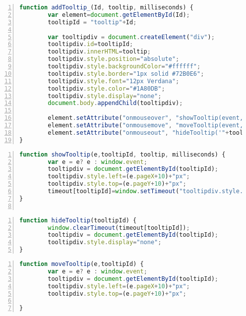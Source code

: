 \begin{frame}[fragile]
\tiny{\begin{lstlisting}[language=JavaScript, 
		   numbers=left,
		   numbersep=3pt,
		   breaklines=true
		   firstnumber=last]
function addTooltip_(Id, tooltip, milliseconds) {
        var element=document.getElementById(Id);
        tooltipId = "tooltip"+Id;

        var tooltipdiv = document.createElement("div");
        tooltipdiv.id=tooltipId;
        tooltipdiv.innerHTML=tooltip;
        tooltipdiv.style.position="absolute";
        tooltipdiv.style.backgroundColor="#ffffff";
        tooltipdiv.style.border="1px solid #72B0E6";
        tooltipdiv.style.font="12px Verdana";
        tooltipdiv.style.color="#1A80DB";
        tooltipdiv.style.display="none";
        document.body.appendChild(tooltipdiv);

        element.setAttribute("onmouseover", "showTooltip(event,'"+tooltipId+"', '"+tooltip+"',"+milliseconds+");");
        element.setAttribute("onmousemove", "moveTooltip(event,'"+tooltipId+"');");
        element.setAttribute("onmouseout", "hideTooltip('"+tooltipId+"');");
}

\end{lstlisting}}
\end{frame}
\begin{frame}[fragile]
\tiny{\begin{lstlisting}[language=JavaScript, 
		   numbers=left,
		   numbersep=3pt,
		   breaklines=true]		 
function showTooltip(e,tooltipId, tooltip, milliseconds) {
        var e = e? e : window.event;
        tooltipdiv = document.getElementById(tooltipId);
        tooltipdiv.style.left=(e.pageX+10)+"px";
        tooltipdiv.style.top=(e.pageY+10)+"px";
        timeout[tooltipId]=window.setTimeout("tooltipdiv.style.display=\"block\"", milliseconds);
}
		   
\end{lstlisting}}
\end{frame}
\begin{frame}[fragile]
\tiny{\begin{lstlisting}[language=JavaScript, 
		   numbers=left,
		   numbersep=3pt,
		   breaklines=true]		 
function hideTooltip(tooltipId) {
        window.clearTimeout(timeout[tooltipId]);
        tooltipdiv = document.getElementById(tooltipId);
        tooltipdiv.style.display="none";
}
\end{lstlisting}}
\end{frame}
\begin{frame}[fragile]
\tiny{\begin{lstlisting}[language=JavaScript, 
		   numbers=left,
		   numbersep=3pt,
		   breaklines=true]		 
function moveTooltip(e,tooltipId) {
        var e = e? e : window.event;
        tooltipdiv = document.getElementById(tooltipId);
        tooltipdiv.style.left=(e.pageX+10)+"px";
        tooltipdiv.style.top=(e.pageY+10)+"px";

}
\end{lstlisting}}
\end{frame}
